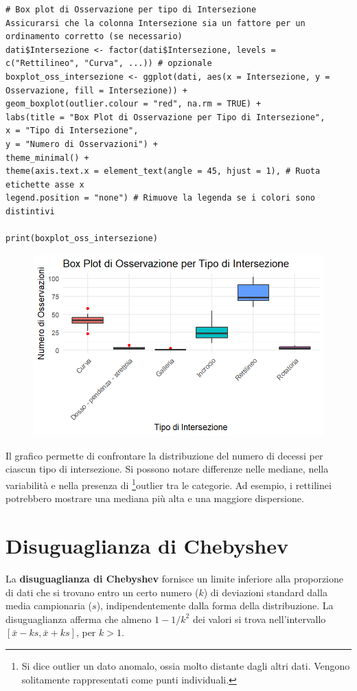 \documentclass[14pt, openany, titlepage]{report} %
\begin{document}
\begin{center}
\begin{lstlisting}[breaklines=true]
# Box plot di Osservazione per tipo di Intersezione
Assicurarsi che la colonna Intersezione sia un fattore per un ordinamento corretto (se necessario)
dati$Intersezione <- factor(dati$Intersezione, levels = c("Rettilineo", "Curva", ...)) # opzionale
boxplot_oss_intersezione <- ggplot(dati, aes(x = Intersezione, y = Osservazione, fill = Intersezione)) +
geom_boxplot(outlier.colour = "red", na.rm = TRUE) +
labs(title = "Box Plot di Osservazione per Tipo di Intersezione",
x = "Tipo di Intersezione",
y = "Numero di Osservazioni") +
theme_minimal() +
theme(axis.text.x = element_text(angle = 45, hjust = 1), # Ruota etichette asse x
legend.position = "none") # Rimuove la legenda se i colori sono distintivi

print(boxplot_oss_intersezione)
\end{lstlisting}
\end{center}

\begin{figure}[H]
\centering
\includegraphics[width=12cm, height=7cm]{Rplot09.png}

\end{figure}
\noindent
Il grafico permette di confrontare la distribuzione  del numero di decessi per ciascun 
tipo di intersezione. Si possono notare differenze nelle mediane, nella variabilità e 
 nella presenza di 
 \footnote{Si dice outlier un dato anomalo, ossia molto distante dagli altri dati. Vengono solitamente rappresentati come punti individuali.}outlier 
 tra le categorie. Ad esempio, i rettilinei potrebbero 
 mostrare una mediana più alta e una maggiore dispersione.

\newpage

\section{Disuguaglianza di Chebyshev}
La \textbf{disuguaglianza di Chebyshev} fornisce un limite inferiore alla proporzione di dati 
che si trovano entro un certo numero ($k$) di deviazioni standard dalla media campionaria ($s$),
indipendentemente dalla forma della distribuzione. La disuguaglianza afferma che 
almeno $1 - 1/k^2$ dei valori si trova nell'intervallo $[\bar{x} - ks, \bar{x} + ks]$, per $k > 1$.
\end{document}
